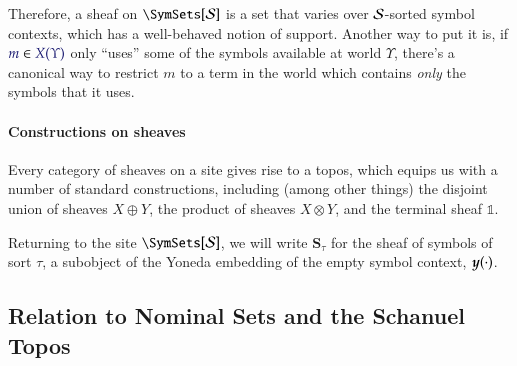\documentclass[11pt]{article}
\theoremstyle{definition}
\theoremstyle{remark}
\numberwithin{equation}{section}
\newcommand\Sheaves[1]{\mathbf{Sh}\left(#1\right)}
\newcommand\Presheaves[1]{\mathbf{Psh}\left(#1\right)}
\newcommand\Sheafify[1]{#1^{\#}}
\newcommand\SCtxSite{\SymSets[\Sorts]}
\begin{document}
Therefore, a sheaf on $\SCtxSite$ is a set that varies over $\mathcal{S}$-sorted
symbol contexts, which has a well-behaved notion of support. Another way to put
it is, if $\Member{m}{X(\Upsilon)}$ only ``uses'' some of the symbols available
at world $\Upsilon$, there's a canonical way to restrict $m$ to a term in the
world which contains \emph{only} the symbols that it uses.

\paragraph{Constructions on sheaves}



Every category of sheaves on a site gives rise to a topos, which equips us with
a number of standard constructions, including (among other things) the disjoint
union of sheaves $X\oplus Y$, the product of sheaves $X\otimes Y$, and the terminal sheaf $\mathbb{1}$.

Returning to the site $\SCtxSite$, we will write $\mathbf{S}_\tau$ for the sheaf
of symbols of sort $\tau$, a subobject of the Yoneda embedding of the empty
symbol context, $\boldsymbol{y} (\cdot)$.

\subsection{Relation to Nominal Sets and the Schanuel Topos}
\end{document}
